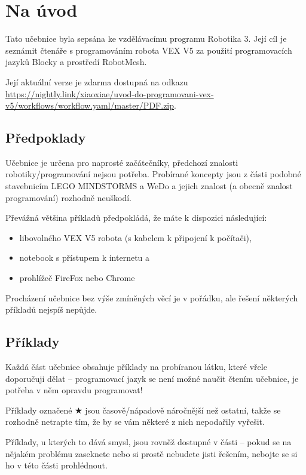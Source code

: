 \tableofcontents
\clearpage

\setcounter{secnumdepth}{0}
\section{Na úvod}
Tato učebnice byla sepsána ke vzdělávacímu programu Robotika 3. Její cíl je seznámit čtenáře s programováním robota VEX V5 za použití programovacích jazyků Blocky a prostředí RobotMesh.

Její aktuální verze je zdarma dostupná na odkazu \href{https://nightly.link/xiaoxiae/uvod-do-programovani-vex-v5/workflows/workflow.yaml/master/PDF.zip
}{https://nightly.link/xiaoxiae/uvod-do-programovani-vex-v5/workflows/workflow.yaml/master/PDF.zip}.

\subsection{Předpoklady}
Učebnice je určena pro naprosté začátečníky, předchozí znalosti robotiky/programování nejsou potřeba. Probírané koncepty jsou z části podobné stavebnicím LEGO MINDSTORMS a WeDo a jejich znalost (a obecně znalost programování) rozhodně neuškodí.

Převážná většina příkladů předpokládá, že máte k dispozici následující:
\begin{itemize}
	\item libovolného VEX V5 robota (s kabelem k připojení k počítači),
	\item notebook s přístupem k internetu a
	\item prohlížeč FireFox nebo Chrome
\end{itemize}

Procházení učebnice bez výše zmíněných věcí je v pořádku, ale řešení některých příkladů nejspíš nepůjde.

\subsection{Příklady}
Každá část učebnice obsahuje příklady na probíranou látku, které vřele doporučuji dělat -- programovací jazyk se není možné naučit čtením učebnice, je potřeba v něm opravdu programovat!

Příklady označené $\bigstar$ jsou časově/nápadově náročnější než ostatní, takže se rozhodně netrapte tím, že by se vám některé z nich nepodařily vyřešit.

Příklady, u kterých to dává smysl, jsou rovněž dostupné v části  -- pokud se na nějakém problému zaseknete nebo si prostě nebudete jisti řešením, nebojte se si ho v této části prohlédnout.

